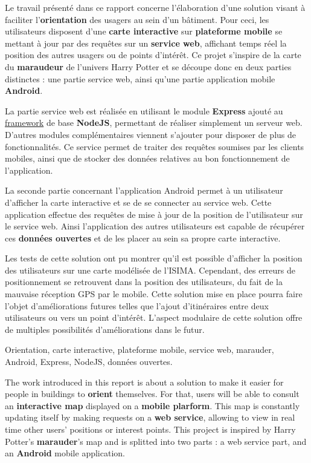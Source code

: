 

Le travail présenté dans ce rapport concerne l'élaboration d'une solution visant à faciliter l’\textbf{orientation} des usagers au sein d'un bâtiment. Pour ceci, les utilisateurs disposent d'une \textbf{carte interactive} sur \textbf{plateforme mobile} se mettant à jour par des requêtes sur un \textbf{service web}, affichant temps réel la position des autres usagers ou de points d’intérêt. Ce projet s’inspire de la carte du \textbf{maraudeur} de l’univers Harry Potter et se découpe donc en deux parties distinctes : une partie service web, ainsi qu'une partie application mobile \textbf{Android}.

La partie service web est réalisée en utilisant le module \textbf{Express} ajouté au \underline{framework} de base \textbf{NodeJS}, permettant de réaliser simplement un serveur web. D'autres modules complémentaires viennent s'ajouter pour disposer de plus de fonctionnalités. Ce service permet de traiter des requêtes soumises par les clients mobiles, ainsi que de stocker des données relatives au bon fonctionnement de l'application.

La seconde partie concernant l'application Android permet à un utilisateur d’afficher la carte interactive et se de se connecter au service web. Cette application effectue des requêtes de mise à jour de la position de l'utilisateur sur le service web. Ainsi l’application des autres utilisateurs est capable de récupérer ces \textbf{données ouvertes} et de les placer au sein sa propre carte interactive.

Les tests de cette solution ont pu montrer qu'il est possible d'afficher la position des utilisateurs sur une carte modélisée de l'ISIMA. Cependant, des erreurs de positionnement se retrouvent dans la position des utilisateurs, du fait de la mauvaise réception GPS par le mobile. Cette solution mise en place pourra faire l'objet d'améliorations futures telles que l'ajout d'itinéraires entre deux utilisateurs ou vers un point d'intérêt. L'aspect modulaire de cette solution offre de multiples possibilités d'améliorations dans le futur.

Orientation, carte interactive, plateforme mobile, service web, marauder, Android, Express, NodeJS, données ouvertes.



The work introduced in this report is about a solution to make it easier for people in buildings to \textbf{orient} themselves. For that, users will be able to consult an \textbf{interactive map} displayed on a \textbf{mobile plarform}. This map is constantly updating itself by making requests on a \textbf{web service}, allowing to view in real time other users' positions or interest points. This project is inspired by Harry Potter's \textbf{marauder}'s map and is splitted into two parts : a web service part, and an \textbf{Android} mobile application.


